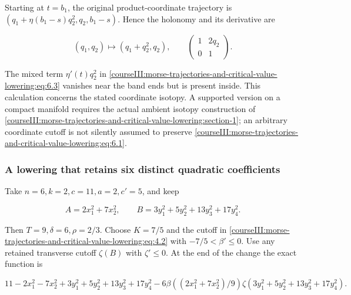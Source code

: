 Starting at \(t=b_1\), the original product-coordinate trajectory is
\((q_1+\eta(b_1-s)q_2^2,q_2,b_1-s)\). Hence the holonomy and its derivative are

\begin{equation}
(q_1,q_2)\longmapsto(q_1+q_2^2,q_2),
 \qquad
 \begin{pmatrix}1&2q_2\\0&1\end{pmatrix}.
 \label{courseIII:morse-trajectories-and-critical-value-lowering:eq:6.4}
\end{equation}

The mixed term \(\eta'(t)q_2^2\) in \eqref{courseIII:morse-trajectories-and-critical-value-lowering:eq:6.3} vanishes near the band ends but is present inside. This calculation concerns the stated coordinate isotopy. A supported version on a compact manifold requires the actual ambient isotopy construction of \cref{courseIII:morse-trajectories-and-critical-value-lowering:section-1}; an arbitrary coordinate cutoff is not silently assumed to preserve \eqref{courseIII:morse-trajectories-and-critical-value-lowering:eq:6.1}.

\subsubsection{A lowering that retains six distinct quadratic coefficients}
\label{courseIII:morse-trajectories-and-critical-value-lowering:section-6.2}

\label{courseIII:trajectory-lowering:6.2}

Take \(n=6,k=2,c=11,a=2,c'=5\), and keep

\begin{equation}
A=2x_1^2+7x_2^2,\qquad
 B=3y_1^2+5y_2^2+13y_3^2+17y_4^2.
 \label{courseIII:morse-trajectories-and-critical-value-lowering:eq:6.5}
\end{equation}

Then \(T=9,\delta=6,\rho=2/3\). Choose \(K=7/5\) and the cutoff in \eqref{courseIII:morse-trajectories-and-critical-value-lowering:eq:4.2} with \(-7/5<\beta'\leq0\). Use any retained transverse cutoff \(\zeta(B)\) with \(\zeta'\leq0\). At the end of the change the exact function is

\begin{equation}
11-2x_1^2-7x_2^2
    +3y_1^2+5y_2^2+13y_3^2+17y_4^2
 -6\beta((2x_1^2+7x_2^2)/9)
       \zeta(3y_1^2+5y_2^2+13y_3^2+17y_4^2).
 \label{courseIII:morse-trajectories-and-critical-value-lowering:eq:6.6}
\end{equation}

